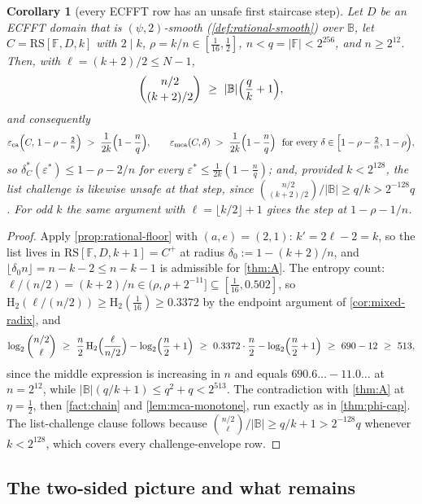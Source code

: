 \documentclass[11pt]{article}
\newtheorem{corollary}[corollary]{Corollary}
\theoremstyle{definition}
\theoremstyle{remark}
\newcommand{\F}{\mathbb{F}}
\newcommand{\B}{\mathbb{B}}
\newcommand{\RS}{\mathrm{RS}}
\newcommand{\eca}{\varepsilon_{\mathrm{ca}}}
\newcommand{\emca}{\varepsilon_{\mathrm{mca}}}
\newcommand{\Hb}{\mathrm{H}_2}
\begin{document}
\begin{corollary}[every ECFFT row has an unsafe first staircase step]\label{cor:ecfft-onestep}
Let $D$ be an ECFFT domain that is $(\psi,2)$-smooth \textup(\cref{def:rational-smooth}\textup) over $\B$, let $C=\RS[\F,D,k]$ with $2\mid k$, $\rho=k/n\in[\tfrac1{16},\tfrac12]$, $n<q=|\F|<2^{256}$, and $n\ge2^{12}$. Then, with $\ell=(k+2)/2\le N-1$,
\[
\binom{n/2}{(k+2)/2}\ \ge\ |\B|\Bigl(\frac qk+1\Bigr),
\]
and consequently
\[
\eca\Bigl(C,\,1-\rho-\tfrac2n\Bigr)\ >\ \frac1{2k}\Bigl(1-\frac nq\Bigr),
\qquad
\emca(C,\delta)\ >\ \frac1{2k}\Bigl(1-\frac nq\Bigr)\ \ \text{for every }\delta\in\Bigl[1-\rho-\tfrac2n,\,1-\rho\Bigr),
\]
so $\delta^*_C(\varepsilon^*)\le1-\rho-2/n$ for every $\varepsilon^*\le\frac1{2k}(1-\frac nq)$; and, provided $k<2^{128}$, the list challenge is likewise unsafe at that step, since $\binom{n/2}{(k+2)/2}/|\B|\ge q/k>2^{-128}q$. For odd $k$ the same argument with $\ell=\lfloor k/2\rfloor+1$ gives the step at $1-\rho-1/n$.
\end{corollary}

\begin{proof}
Apply \cref{prop:rational-floor} with $(a,e)=(2,1)$: $k'=2\ell-2=k$, so the list lives in $\RS[\F,D,k+1]=C^+$ at radius $\delta_0:=1-(k+2)/n$, and $\lfloor\delta_0n\rfloor=n-k-2\le n-k-1$ is admissible for \cref{thm:A}. The entropy count: $\ell/(n/2)=(k+2)/n\in(\rho,\rho+2^{-11}]\subseteq[\tfrac1{16},0.502]$, so $\Hb(\ell/(n/2))\ge\Hb(\tfrac1{16})\ge0.3372$ by the endpoint argument of \cref{cor:mixed-radix}, and
\[
\log_2\binom{n/2}{\ell}\ \ge\ \frac n2\,\Hb\Bigl(\frac{\ell}{n/2}\Bigr)-\log_2\Bigl(\frac n2+1\Bigr)\ \ge\ 0.3372\cdot\frac n2-\log_2\Bigl(\frac n2+1\Bigr)\ \ge\ 690-12\ \ge\ 513,
\]
since the middle expression is increasing in $n$ and equals $690.6\ldots-11.0\ldots$ at $n=2^{12}$, while $|\B|(q/k+1)\le q^2+q<2^{513}$. The contradiction with \cref{thm:A} at $\eta=\frac12$, then \cref{fact:chain} and \cref{lem:mca-monotone}, run exactly as in \cref{thm:phi-cap}. The list-challenge clause follows because $\binom{n/2}{\ell}/|\B|\ge q/k+1>2^{-128}q$ whenever $k<2^{128}$, which covers every challenge-envelope row.
\end{proof}
\subsection{The two-sided picture and what remains}\label{sec:discharge-status}
\end{document}
